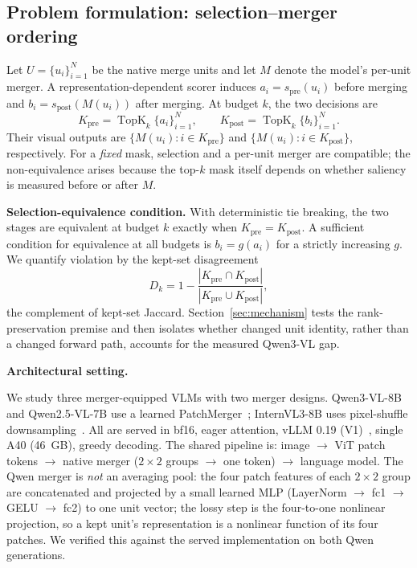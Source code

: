 \documentclass[journal]{IEEEtran}
\begin{document}
\subsection{Problem formulation: selection--merger ordering}\label{sec:models}

Let $U=\{u_i\}_{i=1}^{N}$ be the native merge units and let $M$ denote the
model's per-unit merger. A representation-dependent scorer induces
$a_i=s_{\mathrm{pre}}(u_i)$ before merging and
$b_i=s_{\mathrm{post}}(M(u_i))$ after merging. At budget $k$, the two decisions
are
\begin{equation}
K_{\mathrm{pre}}=\operatorname{TopK}_{k}\{a_i\}_{i=1}^{N},\qquad
K_{\mathrm{post}}=\operatorname{TopK}_{k}\{b_i\}_{i=1}^{N}.
\label{eq:stage-sets}
\end{equation}
Their visual outputs are $\{M(u_i):i\in K_{\mathrm{pre}}\}$ and
$\{M(u_i):i\in K_{\mathrm{post}}\}$, respectively. For a \emph{fixed} mask,
selection and a per-unit merger are compatible; the non-equivalence arises
because the top-$k$ mask itself depends on whether saliency is measured before
or after $M$.

\textbf{Selection-equivalence condition.} With deterministic tie breaking, the
two stages are equivalent at budget $k$ exactly when
$K_{\mathrm{pre}}=K_{\mathrm{post}}$. A sufficient condition for equivalence at
all budgets is $b_i=g(a_i)$ for a strictly increasing $g$. We quantify violation
by the kept-set disagreement
\begin{equation}
D_k=1-\frac{|K_{\mathrm{pre}}\cap K_{\mathrm{post}}|}
{|K_{\mathrm{pre}}\cup K_{\mathrm{post}}|},
\label{eq:stage-disagreement}
\end{equation}
the complement of kept-set Jaccard. Section~\ref{sec:mechanism} tests the
rank-preservation premise and then isolates whether changed unit identity,
rather than a changed forward path, accounts for the measured Qwen3-VL gap.

\textbf{Architectural setting.}

We study three merger-equipped VLMs with two merger designs. Qwen3-VL-8B
and Qwen2.5-VL-7B use a learned PatchMerger~\cite{bai2025qwen3vl,bai2025qwen25vl};
InternVL3-8B uses pixel-shuffle downsampling~\cite{zhu2025internvl3}.
All are served in bf16, eager
attention, vLLM 0.19 (V1)~\cite{kwon2023vllm}, single A40 (46~GB), greedy
decoding. The shared
pipeline is: image $\to$ ViT patch tokens $\to$ native merger ($2\!\times\!2$
groups $\to$ one token) $\to$ language model. The Qwen merger is \emph{not} an
averaging pool: the four patch features of each $2\!\times\!2$ group are
concatenated and projected by a small learned MLP (LayerNorm $\to$ fc1 $\to$
GELU $\to$ fc2) to one unit vector; the lossy step is the four-to-one nonlinear
projection, so a kept unit's representation is a nonlinear function of its four
patches. We verified this against the served implementation on both Qwen
generations.
\end{document}
